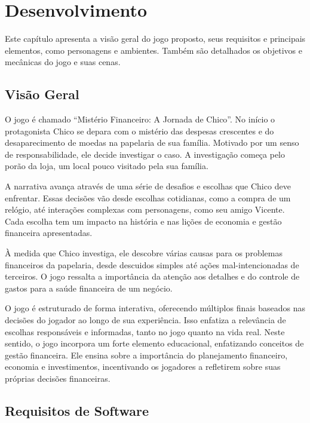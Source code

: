 
\chapter{Desenvolvimento}

Este capítulo apresenta a visão geral do jogo proposto, seus requisitos e principais elementos, como personagens e ambientes. Também são detalhados os objetivos e mecânicas do jogo e suas cenas.

\section{Visão Geral}

O jogo é chamado ``Mistério Financeiro: A Jornada de Chico''. No início o protagonista Chico se depara com o mistério das despesas crescentes e do desaparecimento de moedas na papelaria de sua família. Motivado por um senso de responsabilidade, ele decide investigar o caso. A investigação começa pelo porão da loja, um local pouco visitado pela sua família.

A narrativa avança através de uma série de desafios e escolhas que Chico deve enfrentar. Essas decisões vão desde escolhas cotidianas, como a compra de um relógio, até interações complexas com personagens, como seu amigo Vicente. Cada escolha tem um impacto na história e nas lições de economia e gestão financeira apresentadas.

À medida que Chico investiga, ele descobre várias causas para os problemas financeiros da papelaria, desde descuidos simples até ações mal-intencionadas de terceiros. O jogo ressalta a importância da atenção aos detalhes e do controle de gastos para a saúde financeira de um negócio.

O jogo é estruturado de forma interativa, oferecendo múltiplos finais baseados nas decisões do jogador ao longo de sua experiência. Isso enfatiza a relevância de escolhas responsáveis e informadas, tanto no jogo quanto na vida real. Neste sentido, o jogo incorpora um forte elemento educacional, enfatizando conceitos de gestão financeira. Ele ensina sobre a importância do planejamento financeiro, economia e investimentos, incentivando os jogadores a refletirem sobre suas próprias decisões financeiras.

\section{Requisitos de Software}


